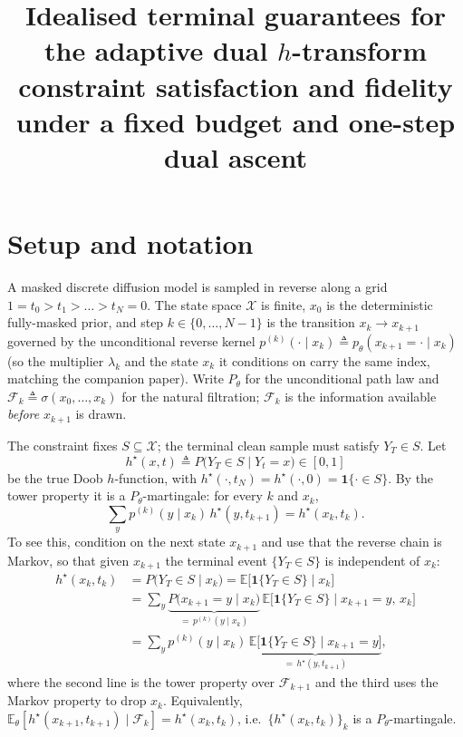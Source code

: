 \documentclass[11pt]{article}
\title{\textbf{Idealised terminal guarantees for the adaptive dual $h$-transform}\\[2pt]
\large constraint satisfaction and fidelity under a fixed budget and one-step dual ascent}
\date{}
\newcommand{\E}{\mathbb{E}}
\newcommand{\X}{\mathcal{X}}
\newcommand{\F}{\mathcal{F}}
\newcommand{\hs}{h^\star}
\theoremstyle{plain}
\theoremstyle{definition}
\theoremstyle{remark}
\begin{document}
\maketitle

\section{Setup and notation}
\label{sec:setup}

A masked discrete diffusion model is sampled in reverse along a grid
$1=t_0>t_1>\dots>t_N=0$. The state space $\X$ is finite, $x_0$ is the deterministic
fully-masked prior, and step $k\in\{0,\dots,N-1\}$ is the transition
$x_k\to x_{k+1}$ governed by the unconditional reverse kernel
$p^{(k)}(\cdot\mid x_k)\triangleq p_\theta(x_{k+1}=\cdot\mid x_k)$ (so the multiplier
$\lambda_k$ and the state $x_k$ it conditions on carry the same index, matching the
companion paper). Write $P_\theta$ for the unconditional path law and
$\F_k\triangleq\sigma(x_0,\dots,x_k)$ for the natural filtration; $\F_k$ is the
information available \emph{before} $x_{k+1}$ is drawn.

The constraint fixes $S\subseteq\X$; the terminal clean sample must satisfy
$Y_T\in S$. Let
\[
\hs(x,t)\triangleq P\big(Y_T\in S\mid Y_t=x\big)\in[0,1]
\]
be the true Doob $h$-function, with $\hs(\cdot,t_N)=\hs(\cdot,0)=\mathbf 1\{\cdot\in S\}$.
By the tower property it is a $P_\theta$-martingale: for every $k$ and $x_k$,
\begin{equation}
\label{eq:mart}
\sum_{y}p^{(k)}(y\mid x_k)\,\hs(y,t_{k+1})=\hs(x_k,t_k).
\end{equation}
To see this, condition on the next state $x_{k+1}$ and use that the reverse chain is
Markov, so that given $x_{k+1}$ the terminal event $\{Y_T\in S\}$ is independent of $x_k$:
\begin{align*}
\hs(x_k,t_k)
&=P\big(Y_T\in S\mid x_k\big)
=\E\big[\mathbf 1\{Y_T\in S\}\mid x_k\big]\\
&=\sum_{y}\underbrace{P\big(x_{k+1}=y\mid x_k\big)}_{=\,p^{(k)}(y\mid x_k)}\,
\E\big[\mathbf 1\{Y_T\in S\}\mid x_{k+1}=y,\,x_k\big]\\
&=\sum_{y}p^{(k)}(y\mid x_k)\,
\underbrace{\E\big[\mathbf 1\{Y_T\in S\}\mid x_{k+1}=y\big]}_{=\,\hs(y,t_{k+1})},
\end{align*}
where the second line is the tower property over $\F_{k+1}$ and the third uses the
Markov property to drop $x_k$. Equivalently,
$\E_\theta[\hs(x_{k+1},t_{k+1})\mid\F_k]=\hs(x_k,t_k)$, i.e.\ $\{\hs(x_k,t_k)\}_k$
is a $P_\theta$-martingale.
\end{document}
